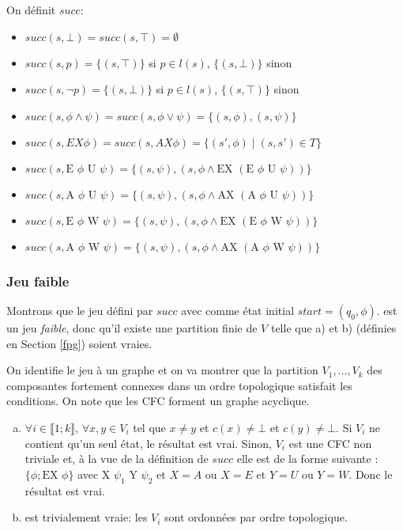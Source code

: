 \documentclass[10pt,a4paper]{article}
\begin{document}
On définit $succ$:
\begin{itemize}
\item$ succ(s, \bot) = succ(s, \top) = \emptyset$
\item $succ(s, p) = \{(s,\top)\}$ si $p \in l(s)$, $\{(s,\bot)\}$ sinon
\item $succ(s, \neg p) = \{(s,\bot)\}$ si $p \in l(s)$, $\{(s,\top)\}$ sinon
\item $succ(s,\phi \land \psi) = succ(s, \phi \lor \psi) = \{(s,\phi), (s,\psi) \}$
\item $succ(s,EX \phi) = succ(s, AX \phi) = \{ (s', \phi) \mid (s,s') \in T \} $
\item $succ(s, \mbox{E } \phi \mbox{ U } \psi) = \{ (s,\psi), (s, \phi \land \mbox{EX }  (\mbox{E } \phi \mbox{ U } \psi)) \}$
\item $succ(s, \mbox{A } \phi \mbox{ U } \psi) = \{ (s,\psi), (s, \phi \land \mbox{AX }  (\mbox{A } \phi \mbox{ U } \psi)) \}$
\item $succ(s, \mbox{E } \phi \mbox{ W } \psi) = \{ (s,\psi), (s, \phi \land \mbox{EX }  (\mbox{E } \phi \mbox{ W } \psi)) \}$
\item $succ(s, \mbox{A } \phi \mbox{ W } \psi) = \{ (s,\psi), (s, \phi \land \mbox{AX } (\mbox{A } \phi \mbox{ W } \psi)) \}$
\end{itemize}

\subsubsection{Jeu faible}
Montrons que le jeu défini par $succ$ avec comme état initial $start = (q_0, \phi)$.
 est un jeu \emph{faible}, donc qu'il existe une partition finie de $V$ telle que a) et b) (définies en Section \ref{fpg}) soient vraies.

On identifie le jeu à un graphe et on va montrer que la partition $V_1, \dots, V_k$ des composantes fortement connexes dans un ordre topologique satisfait les conditions. On note que les CFC forment un graphe acyclique.

\begin{enumerate}[a)]
\item $\forall i \in \llbracket 1 ; k \rrbracket$, $\forall x,y \in V_i$ tel que $x \neq y$ et $c(x) \neq \bot$ et $c(y) \neq \bot$. Si $V_i$ ne contient qu'un seul état, le résultat est vrai. Sinon, $V_i$ est une CFC non triviale et, à la vue de la définition de $succ$ elle est de la forme suivante : $\{ \phi; \mbox{EX }\phi \}$ avec $\mbox{X } \psi_1 \mbox{ Y } \psi_2$ et $ X=A$ ou $X =E$ et $Y = U$ ou $Y=W$. Donc le résultat est vrai.

\item est trivialement vraie: les $V_i$ sont ordonnées par ordre topologique.
\end{enumerate}
\end{document}
